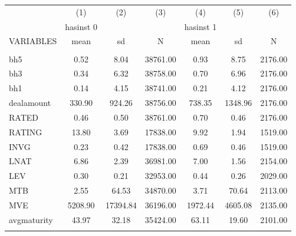 \begin{tabular}{lcccccc} \hline
 & (1) & (2) & (3) & (4) & (5) & (6) \\
 & hasinst 0 &  &  & hasinst 1 &  &  \\
VARIABLES & mean & sd & N & mean & sd & N \\ \hline
 &  &  &  &  &  &  \\
bh5 & 0.52 & 8.04 & 38761.00 & 0.93 & 8.75 & 2176.00 \\
bh3 & 0.34 & 6.32 & 38758.00 & 0.70 & 6.96 & 2176.00 \\
bh1 & 0.14 & 4.15 & 38741.00 & 0.21 & 4.12 & 2176.00 \\
dealamount & 330.90 & 924.26 & 38756.00 & 738.35 & 1348.96 & 2176.00 \\
RATED & 0.46 & 0.50 & 38761.00 & 0.70 & 0.46 & 2176.00 \\
RATING & 13.80 & 3.69 & 17838.00 & 9.92 & 1.94 & 1519.00 \\
INVG & 0.23 & 0.42 & 17838.00 & 0.69 & 0.46 & 1519.00 \\
LNAT & 6.86 & 2.39 & 36981.00 & 7.00 & 1.56 & 2154.00 \\
LEV & 0.30 & 0.21 & 32953.00 & 0.44 & 0.26 & 2029.00 \\
MTB & 2.55 & 64.53 & 34870.00 & 3.71 & 70.64 & 2113.00 \\
MVE & 5208.90 & 17394.84 & 36196.00 & 1972.44 & 4605.08 & 2135.00 \\
avgmaturity & 43.97 & 32.18 & 35424.00 & 63.11 & 19.60 & 2101.00 \\
 &  &  &  &  &  &  \\ \hline
\end{tabular}
